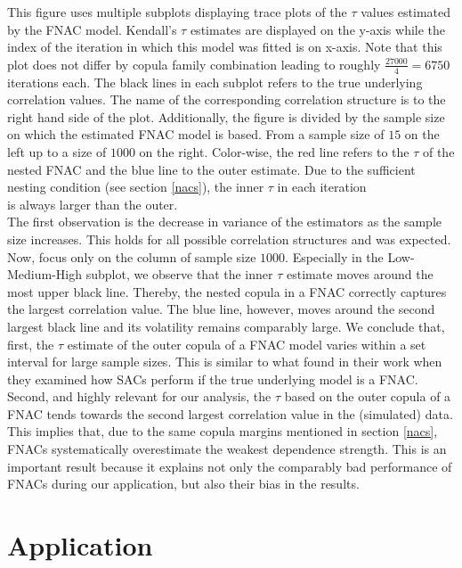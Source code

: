 \documentclass[
]{krantz}
\begin{document}
This figure uses multiple subplots displaying trace plots of the \(\tau\) values estimated by the FNAC model.
Kendall's \(\tau\) estimates are displayed on the y-axis while the index
of the iteration in which this model was fitted is on x-axis. Note that this plot does not differ by
copula family combination leading to roughly \(\frac{27000}{4} = 6750\) iterations each.
The black lines in each subplot refers to the true underlying correlation values.
The name of the corresponding
correlation structure is to the right hand side of the plot.
Additionally, the figure is divided by the sample size on which the estimated FNAC model is based. From a
sample size of \(15\) on the left up to a size of \(1000\) on the right.
Color-wise, the red line refers to the \(\tau\) of the nested FNAC and the blue line to the outer estimate.
Due to the sufficient nesting condition (see section \ref{nacs}), the inner \(\tau\) in each iteration\\
is always larger than the outer.\\
The first observation is the decrease in variance of the estimators as the sample size increases. This holds for
all possible correlation structures and was expected.
Now, focus only on the column of sample size \(1000\). Especially in the Low-Medium-High subplot,
we observe that the inner \(\tau\) estimate moves around the most upper black line.
Thereby, the nested copula in a FNAC correctly captures the largest correlation value.
The blue line, however, moves around the second largest black line and its volatility remains comparably large.
We conclude that, first, the \(\tau\) estimate of the outer copula of a FNAC model varies within a set interval
for large sample sizes. This is similar to what \citet{grimaldi2006} found in their work when they examined
how SACs perform if the true underlying model is a FNAC.
Second, and highly relevant for our analysis,
the \(\tau\) based on the outer copula of a FNAC
tends towards the second largest correlation value in the (simulated) data.
This implies that, due to the same copula margins mentioned in section \ref{nacs}, FNACs systematically
overestimate the weakest dependence strength.
This is an important result because it explains not only the comparably bad performance of FNACs during our
application, but also their bias in the results.

\section{Application}\label{app}
\end{document}
